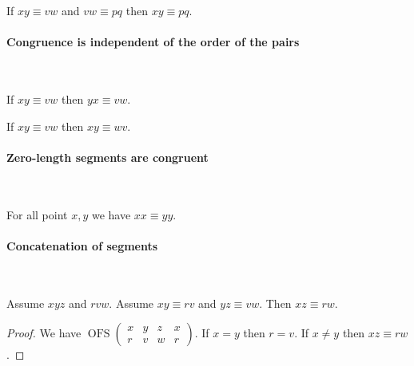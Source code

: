 \documentclass[10pt,a4paper,parskip=half,numbers=endperiod,headings=standardclasses,parskip]{scrbook}
\newcommand{\Cong}[4]{#1 #2 \equiv #3 #4}
\newcommand{\Betw}[3]{#1 #2 #3}
\newcommand{\OFS}[8]{\operatorname{OFS}
\left(\begin{smallmatrix}%
#1 & #2 & #3 & #4 \\
#5 & #6 & #7 & #8
\end{smallmatrix}\right)%
}
\begin{document}
  \begin{forthel}
    \begin{lemma} %
      If $\Cong{x}{y}{v}{w}$ and $\Cong{v}{w}{p}{q}$
      then $\Cong{x}{y}{p}{q}$.
    \end{lemma}
  \end{forthel}


  \paragraph{Congruence is independent of the order of the pairs}\

  \begin{forthel}
    \begin{lemma} %
      If $\Cong{x}{y}{v}{w}$
      then $\Cong{y}{x}{v}{w}$.
    \end{lemma}

    \begin{lemma} %
      If $\Cong{x}{y}{v}{w}$
      then $\Cong{x}{y}{w}{v}$.
    \end{lemma}
  \end{forthel}


  \paragraph{Zero-length segments are congruent}\

  \begin{forthel}
    \begin{lemma} %
      For all point $x, y$ we have $\Cong{x}{x}{y}{y}$.
    \end{lemma}
  \end{forthel}


  \paragraph{Concatenation of segments}\

  \begin{forthel}
    \begin{lemma} %
      Assume $\Betw{x}{y}{z}$ and $\Betw{r}{v}{w}$.
      Assume $\Cong{x}{y}{r}{v}$ and $\Cong{y}{z}{v}{w}$.
      Then $\Cong{x}{z}{r}{w}$.
    \end{lemma}
    \begin{proof}
      We have $\OFS{x}{y}{z}{x}{r}{v}{w}{r}$. %
      If $x = y$ then $r = v$.                %
      If $x \neq y$ then $\Cong{x}{z}{r}{w}$. %
    \end{proof}
  \end{forthel}
\end{document}

